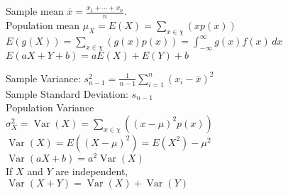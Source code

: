 \documentclass{article}
\DeclareMathOperator{\Var}{Var}
\begin{document}
\begin{figure}[h!]
    \begin{subfigure}{0.5\textwidth}
        Sample mean $\overline{x}=\frac{x_{1}+\cdots+x_{n}}{n}$.\\
        Population mean $\mu_{X}=E(X)=\sum_{x\in\chi}(xp(x))$\\
        $E(g(X))=\sum_{x\in\chi}(g(x)p(x))=\int_{-\infty}^{\infty}g(x)f(x)\,dx$\\
        $E(aX+Y+b)=aE(X)+E(Y)+b$
    \end{subfigure}
    \begin{subfigure}{0.49\textwidth}
        Sample Variance: $s_{n-1}^{2}=\frac{1}{n-1}\sum_{i=1}^{n}(x_{i}-\overline{x})^{2}$\\
        Sample Standard Deviation: $s_{n-1}$\\
        Population Variance $\sigma_{X}^{2}=\Var{(X)}=\sum_{x\in\chi}((x-\mu)^{2}p(x))$\\
        $\Var{(X)}=E((X-\mu)^{2})=E(X^{2})-\mu^{2}$\\
        $\Var{(aX+b)}=a^{2}\Var{(X)}$\\
        If $X$ and $Y$ are independent, $\Var{(X+Y)}=\Var{(X)}+\Var{(Y)}$
    \end{subfigure}
\end{figure}
\end{document}
